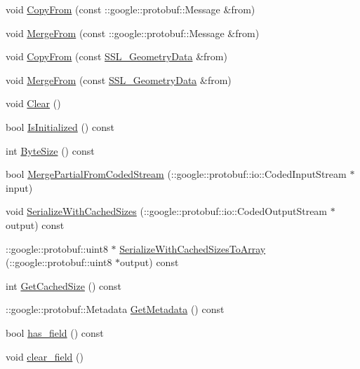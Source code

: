 \begin{DoxyCompactItemize}
\item 
void \hyperlink{class_s_s_l___geometry_data_a2ced313b3578e55e003c1d72bb5fffb5}{Copy\-From} (const \-::google\-::protobuf\-::\-Message \&from)
\item 
void \hyperlink{class_s_s_l___geometry_data_a46996e164c04f1acb8aa63b95c4ec75b}{Merge\-From} (const \-::google\-::protobuf\-::\-Message \&from)
\item 
void \hyperlink{class_s_s_l___geometry_data_a231e8fed8d0155f77d0452bb8930949b}{Copy\-From} (const \hyperlink{class_s_s_l___geometry_data}{S\-S\-L\-\_\-\-Geometry\-Data} \&from)
\item 
void \hyperlink{class_s_s_l___geometry_data_a3f8118e44d84b70f802c580fa5413aa1}{Merge\-From} (const \hyperlink{class_s_s_l___geometry_data}{S\-S\-L\-\_\-\-Geometry\-Data} \&from)
\item 
void \hyperlink{class_s_s_l___geometry_data_ad3dec94519e20e51ab064b06511f8050}{Clear} ()
\item 
bool \hyperlink{class_s_s_l___geometry_data_a2c4c3a07d33f1b136911a27e0db93ae8}{Is\-Initialized} () const 
\item 
int \hyperlink{class_s_s_l___geometry_data_a7383633f263b7fd933e7ab9c0ca5d8e7}{Byte\-Size} () const 
\item 
bool \hyperlink{class_s_s_l___geometry_data_acd53f124c4700f4cc61fc0cc952879d7}{Merge\-Partial\-From\-Coded\-Stream} (\-::google\-::protobuf\-::io\-::\-Coded\-Input\-Stream $\ast$input)
\item 
void \hyperlink{class_s_s_l___geometry_data_a33fe34b42599b8067222ab0b2c2405a1}{Serialize\-With\-Cached\-Sizes} (\-::google\-::protobuf\-::io\-::\-Coded\-Output\-Stream $\ast$output) const 
\item 
\-::google\-::protobuf\-::uint8 $\ast$ \hyperlink{class_s_s_l___geometry_data_aa2a5c1d3d6a660dc05885a8ca4daea53}{Serialize\-With\-Cached\-Sizes\-To\-Array} (\-::google\-::protobuf\-::uint8 $\ast$output) const 
\item 
int \hyperlink{class_s_s_l___geometry_data_af0e304444711d84eb462acc565e12ecc}{Get\-Cached\-Size} () const 
\item 
\-::google\-::protobuf\-::\-Metadata \hyperlink{class_s_s_l___geometry_data_a157f8b896275f588777cac20d12f81c9}{Get\-Metadata} () const 
\item 
bool \hyperlink{class_s_s_l___geometry_data_a9a38020e97f2129cd0d63e5c2eb01ec5}{has\-\_\-field} () const 
\item 
void \hyperlink{class_s_s_l___geometry_data_aec5745bd22a2d32fd9903c415c787c06}{clear\-\_\-field} ()

\end{DoxyCompactItemize}
